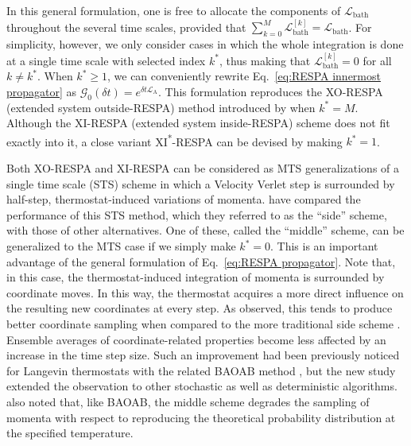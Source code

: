 \documentclass[
aip,
jcp,
reprint,
]{revtex4-1}
\newcommand{\Liu}{\mathcal{L}}
\begin{document}
In this general formulation, one is free to allocate the components of $\Liu_\mathrm{bath}$ throughout the several time scales, provided that $\sum_{k=0}^M \Liu_\mathrm{bath}^{[k]} = \Liu_\mathrm{bath}$.
For simplicity, however, we only consider cases in which the whole integration is done at a single time scale with selected index $k^\ast$, thus making that $\Liu_\mathrm{bath}^{[k]} = 0$ for all $k \neq k^\ast$.
When $k^\ast \geq 1$, we can conveniently rewrite Eq.~\eqref{eq:RESPA innermost propagator} as $\mathcal{G}_0(\delta t) = e^{\delta t \Liu_\mathrm{A}}$.
This formulation reproduces the XO-RESPA (extended system outside-RESPA) method introduced by \citeauthor{Martyna_1996} \cite{Martyna_1996} when $k^\ast = M$.
Although the XI-RESPA (extended system inside-RESPA) scheme \cite{Martyna_1996} does not fit exactly into it, a close variant XI\textsuperscript{*}-RESPA can be devised by making $k^\ast = 1$.

Both XO-RESPA and XI-RESPA can be considered as MTS generalizations of a single time scale (STS) scheme in which a Velocity Verlet step is surrounded by half-step, thermostat-induced variations of momenta.
\citeauthor{Zhang_2017} \cite{Zhang_2017} have compared the performance of this STS method, which they referred to as the ``side'' scheme, with those of other alternatives.
One of these, called the ``middle'' scheme, can be generalized to the MTS case if we simply make $k^\ast = 0$.
This is an important advantage of the general formulation of Eq.~\eqref{eq:RESPA propagator}.
Note that, in this case, the thermostat-induced integration of momenta is surrounded by coordinate moves.
In this way, the thermostat acquires a more direct influence on the resulting new coordinates at every step.
As \citeauthor{Zhang_2017} observed, this tends to produce better coordinate sampling when compared to the more traditional side scheme \cite{Zhang_2017}.
Ensemble averages of coordinate-related properties become less affected by an increase in the time step size.
Such an improvement had been previously noticed for Langevin thermostats with the related BAOAB method \cite{Leimkuhler_2012, Leimkuhler_2013_2}, but the new study extended the observation to other stochastic as well as deterministic algorithms.
\citeauthor{Zhang_2017} \cite{Zhang_2017} also noted that, like BAOAB, the middle scheme degrades the sampling of momenta with respect to reproducing the theoretical probability distribution at the specified temperature.
\end{document}
